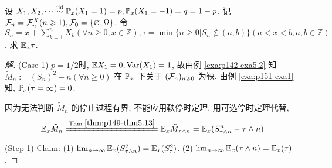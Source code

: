 \begin{example}[赌博的持续时间]\label{exa:p155-exa3}
    设 $X_1,X_2,\cdots \overset{\text{iid}}{\sim} \mathbb{P}_x(X_1=1)=p, \mathbb{P}_x(X_1=-1)=q=1-p$. 记 $\mathcal{F}_n=\mathcal{F}_n^X(n\geqslant 1),\mathcal{F}_0=\{\varnothing,\Omega\}$. 令 $S_n=x+\sum_{k=1}^n X_k (\forall n\geq 0, x\in \mathbb{Z}), \tau=\min\{n\geq 0|S_n\notin (a,b)\}(a<x<b,a,b\in\mathbb{Z})$. 求 $\mathbb E_x \tau$.
\end{example}

\begin{proof}[解]
(Case 1) $p=1/2$时, $\mathbb E X_1=0, \operatorname{Var}(X_1)=1$, 故由例 \ref{exa:p142-exa5.2} 知 $\tilde{M}_n:=(S_n)^2-n(\forall n\geq 0)$ 在 $\mathbb{P}_x$ 下关于 $(\mathcal{F}_n)_{n\geqslant 0}$ 为鞅. 由例 \ref{exa:p151-exa1} 知, $\mathbb{P}_x(\tau=\infty)=0$.

因为无法判断 $\tilde{M}_n$ 的停止过程有界, 不能应用鞅停时定理. 用可选停时定理代替,
\[
\EE_x \tilde{M}_n\xlongequal{\text{Thm }\ref{thm:p149-thm5.13}}\EE_x \tilde{M}_{\tau\land n}=\EE_x(S_{\tau\land n}^n-\tau\land n)
\]

(Step 1) Claim: (1) $\lim_{n \to \infty}\mathbb E_x(S_{\tau\land n}^2)=\mathbb E_x(S_{\tau}^2)$. (2) $\lim_{n \to \infty}\mathbb E_x (\tau\land n)=\mathbb E_x(\tau)$.


\end{proof}
